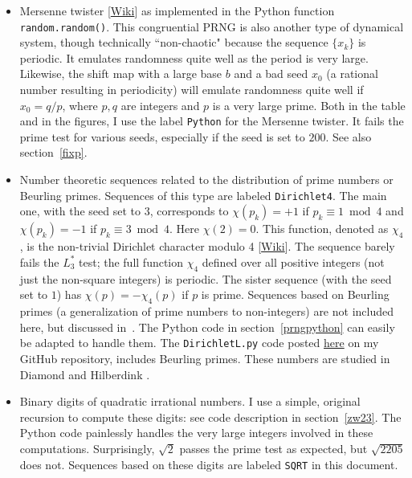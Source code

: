 \documentclass[oneside,10pt]{book}
\begin{document}
\begin{itemize}
\item \textcolor{index}{Mersenne twister} [\href{https://en.wikipedia.org/wiki/Mersenne_Twister}{Wiki}] as
 implemented in the Python function \texttt{random.random()}. This congruential PRNG is also another type of dynamical system,
 though technically ``non-chaotic" because the sequence $\{x_k\}$ 
is periodic. It emulates randomness quite well as the period is very large.
 Likewise, the shift map with a large base $b$ and a bad seed $x_0$ (a rational number resulting in periodicity) will emulate
 randomness quite well if $x_0=q/p$, where $p,q$ are integers and $p$ is a very large prime. Both in the table and in the figures, I use the label \texttt{Python} for the Mersenne twister. It fails the prime test for various seeds, especially if the seed is set to $200$. See also section~\ref{fixp}.
\item Number theoretic sequences related to the distribution of prime numbers or
 \textcolor{index}{Beurling primes}. Sequences of this type are labeled \texttt{Dirichlet4}. The main one, with the seed set to $3$, corresponds to
 $\chi(p_k)=+1$ if $p_k \equiv 1 \bmod 4$ and $\chi(p_k)=-1$ if $p_k \equiv 3\bmod 4$. Here $\chi(2)=0$. This function, denoted as $\chi_4$, is the non-trivial \textcolor{index}{Dirichlet character modulo 4} [\href{https://en.wikipedia.org/wiki/Dirichlet_character}{Wiki}]. The sequence barely fails the $L^*_3$ test; the full function $\chi_4$ defined over all positive integers (not just the non-square integers) is periodic. The sister sequence (with the seed set to $1$) has 
 $\chi(p)=-\chi_4(p)$ if $p$ is prime. Sequences based on Beurling primes (a generalization of prime numbers to non-integers) are not included here, but discussed in~\cite{vgsynthetic}. The Python code 
in section~\ref{prngpython} can easily be adapted to handle them. The \texttt{DirichletL.py} code posted 
 \href{https://github.com/VincentGranville/Experimental-Math-Number-Theory/blob/main/Source-Code/dirichletL.py}{here} on my GitHub repository, includes Beurling primes.  These numbers are studied in 
 Diamond \cite{wen2016} and Hilberdink  \cite{bzf2004}.
\item Binary digits of \textcolor{index}{quadratic irrational} numbers. I use a simple, original recursion to compute these 
digits: see code description in section~\ref{zw23}. The Python code painlessly handles the very large integers involved in these computations. Surprisingly, $\sqrt{2}$ passes the prime test as expected, but $\sqrt{2205}$ does not. Sequences based on these digits are labeled \texttt{SQRT} in this document.
\end{itemize}
\end{document}
